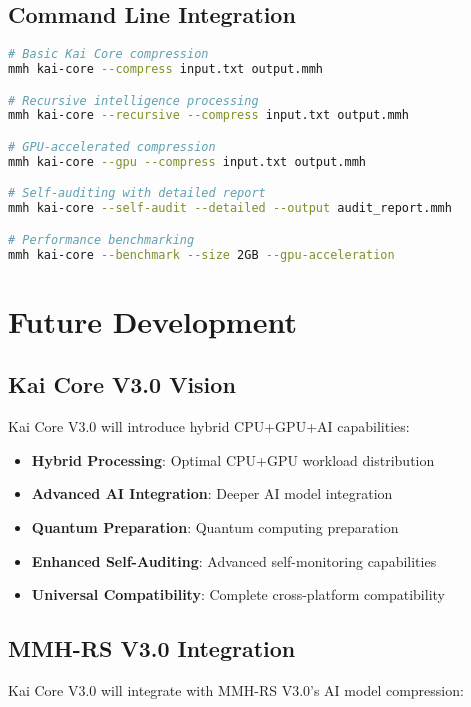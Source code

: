 \documentclass[12pt,a4paper]{article}
\begin{document}
\subsection{Command Line Integration}
\begin{lstlisting}[language=bash, caption=Command Line Examples]
# Basic Kai Core compression
mmh kai-core --compress input.txt output.mmh

# Recursive intelligence processing
mmh kai-core --recursive --compress input.txt output.mmh

# GPU-accelerated compression
mmh kai-core --gpu --compress input.txt output.mmh

# Self-auditing with detailed report
mmh kai-core --self-audit --detailed --output audit_report.mmh

# Performance benchmarking
mmh kai-core --benchmark --size 2GB --gpu-acceleration
\end{lstlisting}

\newpage

\section{Future Development}

\subsection{Kai Core V3.0 Vision}
Kai Core V3.0 will introduce hybrid CPU+GPU+AI capabilities:

\begin{itemize}
    \item \textbf{Hybrid Processing}: Optimal CPU+GPU workload distribution
    \item \textbf{Advanced AI Integration}: Deeper AI model integration
    \item \textbf{Quantum Preparation}: Quantum computing preparation
    \item \textbf{Enhanced Self-Auditing}: Advanced self-monitoring capabilities
    \item \textbf{Universal Compatibility}: Complete cross-platform compatibility
\end{itemize}

\subsection{MMH-RS V3.0 Integration}
Kai Core V3.0 will integrate with MMH-RS V3.0's AI model compression:
\end{document}
